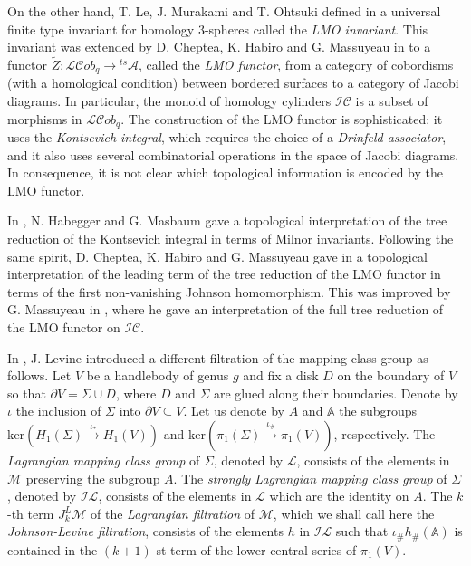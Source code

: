 \documentclass[10pt]{amsart}
\numberwithin{equation}{section}
\numberwithin{equation}{section}
\theoremstyle{definition}
\begin{document}
On the other hand, T. Le, J. Murakami and T. Ohtsuki  defined in \cite{MR1604883} a universal finite type invariant for homology $3$-spheres called the   \emph{LMO invariant}. This invariant was extended by D. Cheptea, K. Habiro and G. Massuyeau in \cite{MR2403806} to a functor $\widetilde{Z}:\mathcal{LC}ob_q\rightarrow {}^{ts}\!\!\mathcal{A}$, called the  \emph{LMO functor}, from a category of cobordisms (with a homological condition)  between bordered surfaces to a category of Jacobi diagrams. In particular, the monoid of homology cylinders $\mathcal{IC}$ is a subset of morphisms in $\mathcal{LC}ob_q$. The construction of the LMO functor is sophisticated: it uses the \emph{Kontsevich integral}, which requires the choice of a \emph{Drinfeld associator}, and it also uses several combinatorial operations in the space of Jacobi diagrams. In consequence, it is not clear which topological  information is encoded by the LMO functor.

In \cite{MR1783857}, N. Habegger and G. Masbaum gave a topological interpretation of the  tree reduction of the Kontsevich integral in terms of Milnor invariants. Following the same spirit,  D. Cheptea, K. Habiro and G. Massuyeau gave in \cite{MR2403806} a topological interpretation of the leading term of the  tree reduction of the LMO functor in terms of the first non-vanishing Johnson homomorphism. This was improved by G. Massuyeau in \cite{MR2903772}, where he gave an interpretation of the full tree reduction of the LMO functor on $\mathcal{IC}$. 

In \cite{MR1823501,MR2265877}, J. Levine introduced a different filtration of the mapping class group as follows. Let $V$ be a handlebody of genus $g$ and fix a disk $D$ on the boundary of $V$ so that $\partial V=\Sigma\cup D$, where $D$ and $\Sigma$ are glued along their boundaries. Denote by $\iota$ the inclusion of $\Sigma$ into $\partial V\subseteq V$. Let us denote by $A$ and $\mathbb{A}$ the subgroups $\text{ker}(H_1(\Sigma)\stackrel{\iota_*}{\longrightarrow} H_1(V))$ and $\text{ker}(\pi_1(\Sigma)\stackrel{\iota_{\#}}{\longrightarrow}\pi_1(V))$, respectively. The \emph{Lagrangian mapping class group} of $\Sigma$, denoted by $\mathcal{L}$, consists of the elements in $\mathcal{M}$ preserving the subgroup $A$. The \emph{strongly Lagrangian mapping class group} of $\Sigma$, denoted by $\mathcal{IL}$,  consists of the elements in $\mathcal{L}$ which are the identity on $A$. The $k$-th term $J_k^L\mathcal{M}$ of the \emph{Lagrangian filtration} of $\mathcal{M}$, which we shall call here the  \emph{Johnson-Levine filtration}, consists of the elements $h$ in $\mathcal{IL}$ such that $\iota_{\#}h_{\#}(\mathbb{A})$ is contained in the $(k+1)$-st term of the lower central series of $\pi_1(V)$. 
\end{document}
